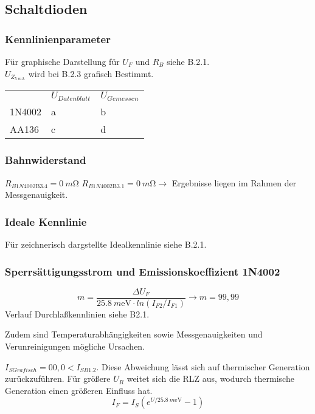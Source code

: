 \documentclass[
	a4paper, %
	12pt, %
]{CSUniSchoolLabReport}
\newcommand{\milli}{m}
\begin{document}
\subsection{Schaltdioden}
\subsubsection{Kennlinienparameter}
Für graphische Darstellung für $U_F$ und $R_B$ siehe B.2.1. \\
$U_{Z_{\SI{5}{\milli\ampere}}}$ wird bei B.2.3 grafisch Bestimmt. \\
\begin{table}[]
\begin{tabular}{@{}ll|l@{}}
							& $U_{Datenblatt}$ & $U_{Gemessen}$ \\
\cmidrule(l){2-3}
\multicolumn{1}{l|}{1N4002} & a              & b            \\
\midrule
\multicolumn{1}{l|}{AA136}  & c              & d           
\end{tabular}
\end{table}


\subsubsection{Bahnwiderstand}
$R_{B1N4002\text{B3.4}} = \SI{0}{\milli\ohm}$ $R_{B1N4002\text{B3.1}} = \SI{0}{\milli\ohm}\rightarrow $ Ergebnisse liegen im Rahmen der Messgenauigkeit. 
\subsubsection{Ideale Kennlinie}
Für zeichnerisch dargstellte Idealkennlinie siehe B.2.1.
\subsubsection{Sperrsättigungsstrom und Emissionskoeffizient 1N4002}
\[
m = \frac{\Delta U_F}{\SI{25.8}{\milli\electronvolt}\cdot ln(I_{F2}/I_{F1})} \rightarrow m = 99,99
\]
Verlauf Durchlaßkennlinien siehe B2.1. 



Zudem sind Temperaturabhängigkeiten sowie Messgenauigkeiten und Verunreinigungen mögliche Ursachen. 

$I_{S Grafisch} = 00,0 < I_{S B1.2}$. Diese Abweichung lässt sich auf thermischer Generation zurückzuführen. Für größere $U_R$ weitet sich die RLZ aus, wodurch thermische Generation einen größeren Einfluss hat. 
\[
I_F = I_S(e^{U/\SI{25.8}{\milli\electronvolt}}-1)
\]
\end{document}
